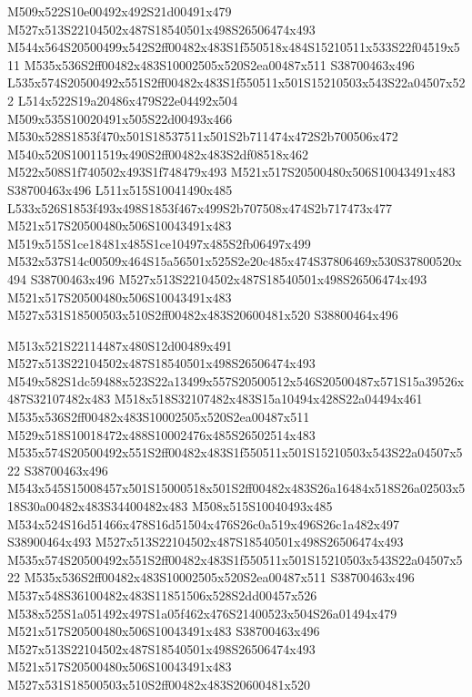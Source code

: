 \documentclass{article}
\begin{document}
\begin{multicols}{2}
M509x522S10e00492x492S21d00491x479 M527x513S22104502x487S18540501x498S26506474x493 M544x564S20500499x542S2ff00482x483S1f550518x484S15210511x533S22f04519x511 M535x536S2ff00482x483S10002505x520S2ea00487x511 S38700463x496 L535x574S20500492x551S2ff00482x483S1f550511x501S15210503x543S22a04507x522 L514x522S19a20486x479S22e04492x504 M509x535S10020491x505S22d00493x466 M530x528S1853f470x501S18537511x501S2b711474x472S2b700506x472 M540x520S10011519x490S2ff00482x483S2df08518x462 M522x508S1f740502x493S1f748479x493 M521x517S20500480x506S10043491x483 S38700463x496 L511x515S10041490x485 L533x526S1853f493x498S1853f467x499S2b707508x474S2b717473x477 M521x517S20500480x506S10043491x483 M519x515S1ce18481x485S1ce10497x485S2fb06497x499 M532x537S14c00509x464S15a56501x525S2e20c485x474S37806469x530S37800520x494 S38700463x496 M527x513S22104502x487S18540501x498S26506474x493 M521x517S20500480x506S10043491x483 M527x531S18500503x510S2ff00482x483S20600481x520 S38800464x496

M513x521S22114487x480S12d00489x491 M527x513S22104502x487S18540501x498S26506474x493 M549x582S1dc59488x523S22a13499x557S20500512x546S20500487x571S15a39526x487S32107482x483 M518x518S32107482x483S15a10494x428S22a04494x461 M535x536S2ff00482x483S10002505x520S2ea00487x511 M529x518S10018472x488S10002476x485S26502514x483 M535x574S20500492x551S2ff00482x483S1f550511x501S15210503x543S22a04507x522 S38700463x496 M543x545S15008457x501S15000518x501S2ff00482x483S26a16484x518S26a02503x518S30a00482x483S34400482x483 M508x515S10040493x485 M534x524S16d51466x478S16d51504x476S26c0a519x496S26c1a482x497 S38900464x493 M527x513S22104502x487S18540501x498S26506474x493 M535x574S20500492x551S2ff00482x483S1f550511x501S15210503x543S22a04507x522 M535x536S2ff00482x483S10002505x520S2ea00487x511 S38700463x496 M537x548S36100482x483S11851506x528S2dd00457x526 M538x525S1a051492x497S1a05f462x476S21400523x504S26a01494x479 M521x517S20500480x506S10043491x483 S38700463x496 M527x513S22104502x487S18540501x498S26506474x493 M521x517S20500480x506S10043491x483 M527x531S18500503x510S2ff00482x483S20600481x520


\end{multicols}
\end{document}
